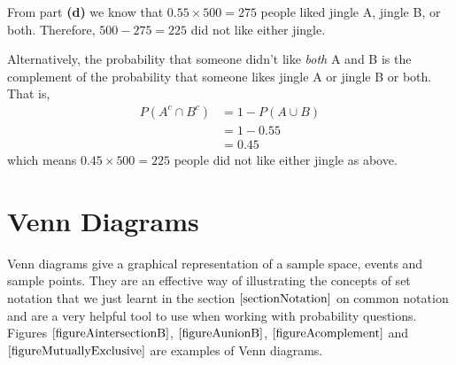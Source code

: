 \begin{example}
\begin{benumerate}
From part \textbf{(d)} we know that $0.55 \times 500 = 275$ people liked jingle A, jingle B, or both. Therefore, $500-275=225$ did not like either jingle.

Alternatively, the probability that someone didn't like \textit{both} A and B is the complement of the probability that someone likes jingle A or jingle B or both. That is,
\begin{align*}
P(A^{c} \cap B^{c}) &= 1 - P(A \cup B) \\
					&= 1 - 0.55 \\
					&= 0.45
\end{align*}
which means $0.45 \times 500 = 225$ people did not like either jingle as above.
\end{benumerate}
\end{example}

\section{Venn Diagrams}

Venn diagrams give a graphical representation of a sample space, events and sample points.
They are an effective way of illustrating the concepts of set notation that we just learnt in the section $\ref{sectionNotation}$ on common notation and are a very helpful tool to use when working with probability questions.
Figures $\ref{figureAintersectionB}$, $\ref{figureAunionB}$, $\ref{figureAcomplement}$
and $\ref{figureMutuallyExclusive}$ are examples of Venn diagrams. 


